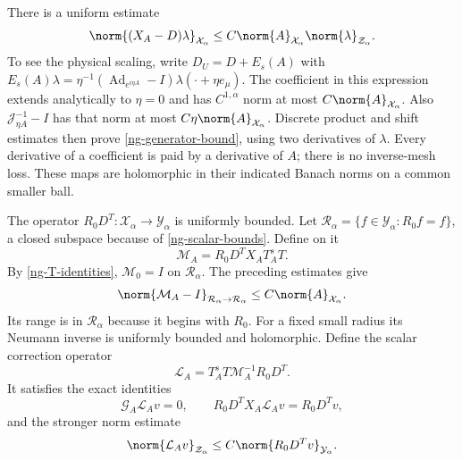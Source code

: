 There is a uniform estimate
\begin{equation}\label{ng-generator-bound}
 \norm{(X_A-D)\lambda}_{\mathcal X_\alpha}
       \le C\norm{A}_{\mathcal X_\alpha}
                        \norm{\lambda}_{\mathcal Z_\alpha}.
\end{equation}
To see the physical scaling, write
$D_U=D+E_s(A)$ with
$E_s(A)\lambda=\eta^{-1}(\operatorname{Ad}_{e^{i\eta A}}-I)
\lambda(\cdot+\eta e_\mu)$.
The coefficient in this expression extends analytically to
$\eta=0$ and has $C^{1,\alpha}$ norm at most
$C\norm{A}_{\mathcal X_\alpha}$.
Also $\mathcal J_{\eta A}^{-1}-I$ has that norm at most
$C\eta\norm{A}_{\mathcal X_\alpha}$.
Discrete product and shift estimates then prove
\eqref{ng-generator-bound}, using two derivatives of $\lambda$.
Every derivative of a coefficient is paid by a derivative of $A$;
there is no inverse-mesh loss. These maps are holomorphic in their
indicated Banach norms on a common smaller ball.

The operator $R_0D^T:\mathcal X_\alpha\to\mathcal Y_\alpha$
is uniformly bounded. Let
$\mathcal R_\alpha=\{f\in\mathcal Y_\alpha:R_0f=f\}$,
a closed subspace because of \eqref{ng-scalar-bounds}. Define on it
\begin{equation}\label{ng-fixing-map}
 \mathcal M_A=R_0D^TX_AT_A^sT.
\end{equation}
By \eqref{ng-T-identities}, $\mathcal M_0=I$ on
$\mathcal R_\alpha$. The preceding estimates give
\begin{equation}\label{ng-fixing-smallness}
 \norm{\mathcal M_A-I}_{\mathcal R_\alpha\to\mathcal R_\alpha}
       \le C\norm{A}_{\mathcal X_\alpha}.
\end{equation}
Its range is in $\mathcal R_\alpha$ because it begins with $R_0$.
For a fixed small radius its Neumann inverse is uniformly bounded
and holomorphic. Define the scalar correction operator
\begin{equation}\label{ng-correction}
 \mathcal L_A=T_A^sT\mathcal M_A^{-1}R_0D^T.
\end{equation}
It satisfies the exact identities
\begin{equation}\label{ng-correction-identities}
 \mathcal G_A\mathcal L_Av=0,\qquad
 R_0D^TX_A\mathcal L_Av=R_0D^Tv,
\end{equation}
and the stronger norm estimate
\begin{equation}\label{ng-correction-bound}
 \norm{\mathcal L_Av}_{\mathcal Z_\alpha}
       \le C\norm{R_0D^Tv}_{\mathcal Y_\alpha}.
\end{equation}


